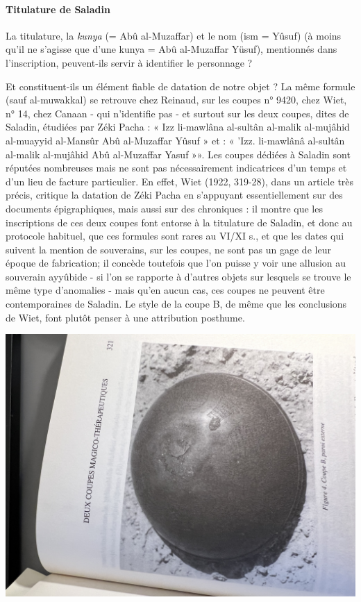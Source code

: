 \paragraph{Titulature de Saladin}
La titulature, la \textit{kunya} (= Abû al-Muzaffar) et le nom (ism = Yûsuf) (à
moins qu'il ne s'agisse que d'une kunya = Abû al-Muzaffar Yüsuf), mentionnés dans l'inscription, peuvent-ils servir à identifier le personnage ?

Et constituent-ils un élément fiable de datation de notre objet ? La même formule (sauf al-muwakkal) se retrouve chez Reinaud, sur les coupes n° 9420, chez Wiet, n° 14, chez Canaan - qui n'identifie pas - et surtout sur les deux coupes, dites de Saladin, étudiées par Zéki Pacha : « Izz li-mawlâna al-sultân al-malik al-mujâhid al-muayyid al-Mansûr Abû al-Muzaffar Yûsuf » et : « 'Izz. li-mawlânâ al-sultân al-malik al-mujâhid Abû al-Muzaffar Yasuf »». Les coupes dédiées à Saladin sont réputées nombreuses   mais ne sont pas nécessairement indicatrices d'un temps et d'un lieu de facture particulier. 
En effet, Wiet (1922, 319-28), dans un article très précis, critique la datation de Zéki Pacha en s'appuyant essentiellement sur des documents épigraphiques, mais aussi sur des chroniques : il montre que les inscriptions de ces deux coupes font entorse à la titulature de Saladin, et donc au protocole habituel, que ces formules sont rares au VI/XI s., et que les dates qui suivent la mention de souverains, sur les coupes, ne sont pas un gage de leur époque de fabrication; il concède toutefois que l'on puisse y voir une allusion au souverain ayyûbide - si l'on se rapporte à d'autres objets sur lesquels se trouve le même type d'anomalies - mais qu'en aucun cas, ces coupes ne peuvent être contemporaines de Saladin. Le style de la coupe B, de même que les conclusions de Wiet, font plutôt penser à une attribution posthume.

  \includegraphics[width=\textwidth]{HommeetIslam/Images/IMG_2458.JPG}
